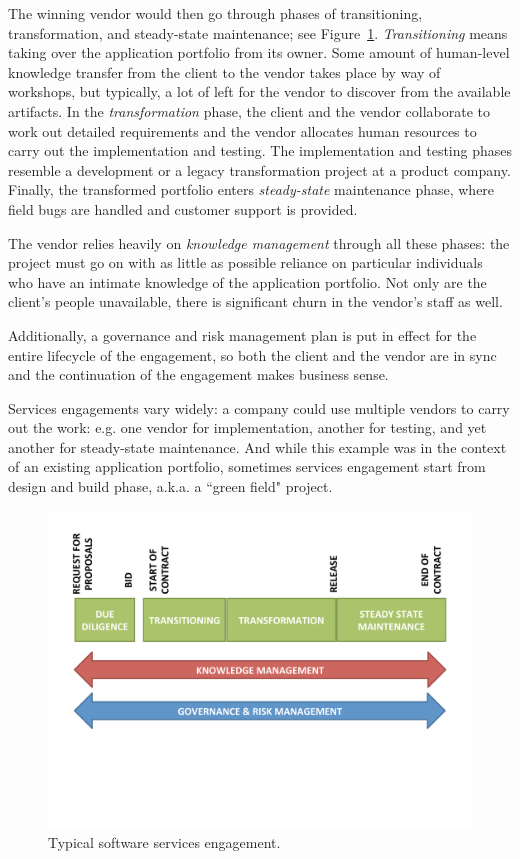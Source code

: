 The winning vendor would then go through phases of transitioning, transformation, and steady-state maintenance; see Figure~\ref{fig:phases}. \textit{Transitioning} means taking over the application portfolio from its owner. Some amount of human-level knowledge transfer from the client to the vendor takes place by way of workshops, but typically, a lot of left for the vendor to discover from the available artifacts. In the \textit{transformation} phase, the client and the vendor collaborate to work out detailed requirements and the vendor allocates human resources to carry out the implementation and testing. The implementation and testing phases resemble a development or a legacy transformation project at a product company.  Finally, the transformed portfolio enters \textit{steady-state} maintenance phase, where field bugs are handled and customer support is provided.

The vendor relies heavily on \textit{knowledge management} through all these phases: the project must go on with as little as possible reliance on particular individuals who have an intimate knowledge of the application portfolio. Not only are the client's people unavailable, there is significant churn in the vendor's staff as well.

Additionally, a governance and risk management plan is put in effect for the entire lifecycle of the engagement, so both the client and the vendor are in sync and the continuation of the engagement makes business sense.

Services engagements vary widely: a company could use multiple vendors to carry out the work: e.g. one vendor for implementation, another for testing, and yet another for steady-state maintenance.  And while this example was in the context of an existing application portfolio, sometimes services engagement start from design and build phase, a.k.a. a ``green field" project.


%
%
%

\begin{figure}[t]
\centering
\includegraphics[width=0.9\columnwidth, clip, trim = 0mm 50mm 0mm
  17mm]{figs/phases.pdf}
\vspace*{-15pt}
\caption{Typical software services engagement.}
\vspace*{-10pt}
\label{fig:phases}
\end{figure}


